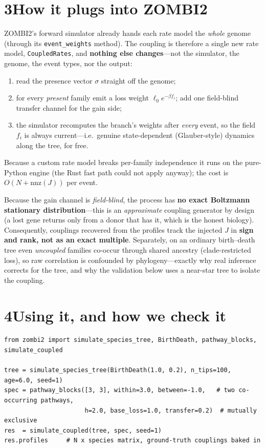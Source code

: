 \documentclass[11pt]{article}
\begin{document}
\section*{\textcolor{mainblue}{3\quad How it plugs into ZOMBI2}}
ZOMBI2's forward simulator already hands each rate model the \emph{whole} genome (through its
\texttt{event\_weights} method). The coupling is therefore a single new rate
model, \texttt{CoupledRates}, and \textbf{nothing else changes}---not the simulator, the
genome, the event types, nor the output:

\begin{enumerate}
\item read the presence vector $\sigma$ straight off the genome;
\item for every \emph{present} family emit a loss weight $\ell_0 e^{-\beta f_i}$; add one
  field-blind transfer channel for the gain side;
\item the simulator recomputes the branch's weights after \emph{every} event, so the field
  $f_i$ is always current---i.e.\ genuine state-dependent (Glauber-style) dynamics along the
  tree, for free.
\end{enumerate}
Because a custom rate model breaks per-family independence it runs on the pure-Python engine
(the Rust fast path could not apply anyway); the cost is $O(N+\text{nnz}(J))$ per event.

\begin{warningbox}
Because the gain channel is \emph{field-blind}, the process has \textbf{no exact Boltzmann
stationary distribution}---this is an \emph{approximate} coupling generator by design (a lost
gene returns only from a donor that has it, which is the honest biology). Consequently,
couplings recovered from the profiles track the injected $J$ in \textbf{sign and rank, not as
an exact multiple}. Separately, on an ordinary birth--death tree even \emph{uncoupled}
families co-occur through shared ancestry (clade-restricted loss), so raw correlation is
confounded by phylogeny---exactly why real inference corrects for the tree, and why the
validation below uses a near-star tree to isolate the coupling.
\end{warningbox}

\section*{\textcolor{mainblue}{4\quad Using it, and how we check it}}
\begin{lstlisting}[style=py]
from zombi2 import simulate_species_tree, BirthDeath, pathway_blocks, simulate_coupled

tree = simulate_species_tree(BirthDeath(1.0, 0.2), n_tips=100, age=6.0, seed=1)
spec = pathway_blocks([3, 3], within=3.0, between=-1.0,   # two co-occurring pathways,
                      h=2.0, base_loss=1.0, transfer=0.2)  # mutually exclusive
res  = simulate_coupled(tree, spec, seed=1)
res.profiles     # N x species matrix, ground-truth couplings baked in
\end{lstlisting}
\end{document}
